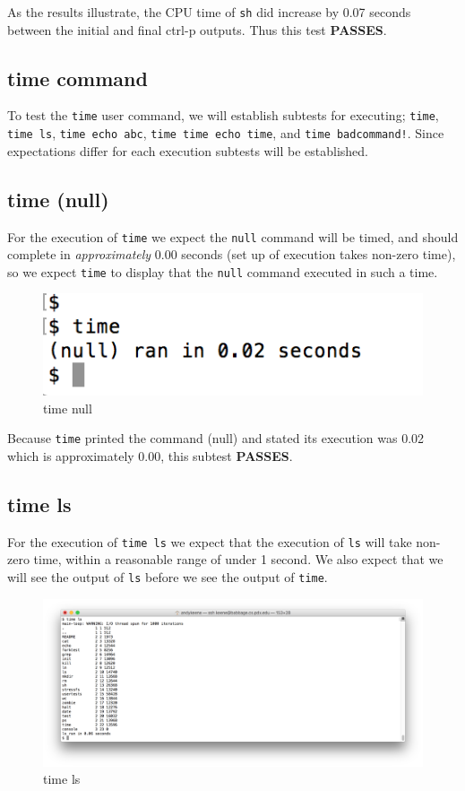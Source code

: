 \documentclass[11pt,letterpaper]{report}
\begin{document}
	As the results illustrate, the CPU time of {\tt sh} did increase by 0.07 seconds between the initial and final ctrl-p outputs. Thus this test \textbf{PASSES}.
	
\subsection*{time command}
	To test the {\tt time} user command, we will establish subtests for executing; {\tt time}, {\tt time ls}, {\tt time echo abc}, {\tt time time echo time}, and 
	{\tt time badcommand!}. Since expectations differ for each execution subtests will be established.

\subsection*{time (null)}
	For the execution of {\tt time} we expect the {\tt null} command will be timed, and should complete in \emph{approximately} 0.00 seconds (set up of execution takes
	non-zero time), so we expect {\tt time} to display
	that the {\tt null} command executed in such a time.
	
	\begin{figure}[h!]
\centering
\includegraphics[width=.6\linewidth]{time-null.png}
\caption[timenull]{time null}
\label{fig:timenull}
\end{figure}
	
	Because {\tt time} printed the command (null) and stated its execution was 0.02 which is approximately 0.00, this subtest \textbf{PASSES}.
	
\subsection*{time ls}
	For the execution of {\tt time ls} we expect that the execution of {\tt ls} will take non-zero time, within a reasonable range of under 1 second. We also expect that we will
	see the output of {\tt ls} before we see the output of {\tt time}.
	
	\begin{figure}[h!]
\centering
\includegraphics[width=.9\linewidth]{time-ls.png}
\caption[timels]{time ls}
\label{fig:timels}
\end{figure}
	
\end{document}

